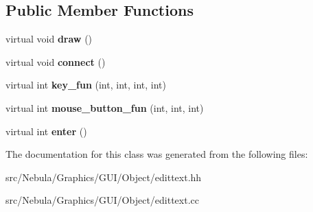 \subsection*{\-Public \-Member \-Functions}
\begin{DoxyCompactItemize}
\item 
\hypertarget{classNeb_1_1Graphics_1_1GUI_1_1Object_1_1edittext_a8c2d23fe6fa431c201651569bcec6786}{virtual void {\bfseries draw} ()}\label{classNeb_1_1Graphics_1_1GUI_1_1Object_1_1edittext_a8c2d23fe6fa431c201651569bcec6786}

\item 
\hypertarget{classNeb_1_1Graphics_1_1GUI_1_1Object_1_1edittext_ad81995224b565304dd9c1086e3fc6b24}{virtual void {\bfseries connect} ()}\label{classNeb_1_1Graphics_1_1GUI_1_1Object_1_1edittext_ad81995224b565304dd9c1086e3fc6b24}

\item 
\hypertarget{classNeb_1_1Graphics_1_1GUI_1_1Object_1_1edittext_a6336834501dedc56c5e66c5d5fe97219}{virtual int {\bfseries key\-\_\-fun} (int, int, int, int)}\label{classNeb_1_1Graphics_1_1GUI_1_1Object_1_1edittext_a6336834501dedc56c5e66c5d5fe97219}

\item 
\hypertarget{classNeb_1_1Graphics_1_1GUI_1_1Object_1_1edittext_aaa6ff4278ff35b68ba9ea67c79360cd5}{virtual int {\bfseries mouse\-\_\-button\-\_\-fun} (int, int, int)}\label{classNeb_1_1Graphics_1_1GUI_1_1Object_1_1edittext_aaa6ff4278ff35b68ba9ea67c79360cd5}

\item 
\hypertarget{classNeb_1_1Graphics_1_1GUI_1_1Object_1_1edittext_a3b1d7b239e4641981a4bd93df729a65d}{virtual int {\bfseries enter} ()}\label{classNeb_1_1Graphics_1_1GUI_1_1Object_1_1edittext_a3b1d7b239e4641981a4bd93df729a65d}

\end{DoxyCompactItemize}


\-The documentation for this class was generated from the following files\-:\begin{DoxyCompactItemize}
\item 
src/\-Nebula/\-Graphics/\-G\-U\-I/\-Object/edittext.\-hh\item 
src/\-Nebula/\-Graphics/\-G\-U\-I/\-Object/edittext.\-cc\end{DoxyCompactItemize}
